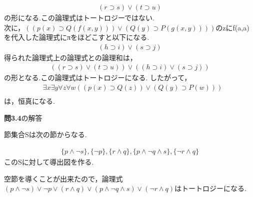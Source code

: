 \documentclass[11pt,dvipdfmx]{jreport}
\begin{document}
\begin{equation*}
  \begin{array}{lll}
    & (r \supset s) \lor (t \supset u) & 
  \end{array}
\end{equation*}
の形になる.この論理式はトートロジーではない.\\
次に，$((p(x) \supset Q(f(x,y))) \lor (Q(y)\supset P(g(x,y))))$のzにf(a,a)を代入した論理式にπをほどこすと以下になる.
\begin{equation*}
  \begin{array}{lll}
    & (h \supset i) \lor (s \supset j) & 
  \end{array}
\end{equation*}
得られた論理式上の論理式との論理和は，
\begin{equation*}
  \begin{array}{lll}
    & ((r \supset s) \lor (t \supset u)) \lor ((h \supset i) \lor (s \supset j)) & 
  \end{array}
\end{equation*}
の形となる.この論理式はトートロジーになる.
したがって，
\begin{equation*}
  \begin{array}{lll}
    & \exists x \exists y \forall z \forall w ((p(x) \supset Q(z)) \lor (Q(y)\supset P(w)))\\
  \end{array}
\end{equation*}
は，恒真になる.

\noindent \textbf{問3.4}の解答 
\par
節集合Sは次の節からなる.\par
\begin{equation*}
  \begin{array}{lll}
      \{p \land \lnot s\},\{ \lnot p\},\{r \land q\},
      \{p \land \lnot q \land s\},\{\lnot r \land q\}
  \end{array}
\end{equation*}
このSに対して導出図を作る.\par
\begin{figure}[!htbp]
\end{figure}
空節を導くことが出来たので，論理式$(p \land \lnot s) \lor \lnot p \lor (r \land q) \lor (p \land \lnot q \land s) \lor (\lnot r \land q)$はトートロジーになる.


\appendix
\end{document}
